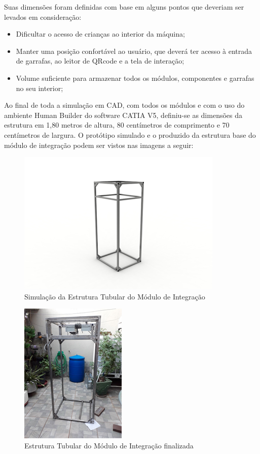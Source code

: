 Suas dimensões foram definidas com base em alguns pontos que deveriam ser levados em consideração: 

\begin{itemize}
    \item Dificultar o acesso de crianças ao interior da máquina;
    \item Manter uma posição confortável ao usuário, que deverá ter acesso à entrada de garrafas, ao leitor de QRcode e a tela de interação;
    \item Volume suficiente para armazenar todos os módulos, componentes e garrafas no seu interior;
\end{itemize}

Ao final de toda a simulação em CAD, com todos os módulos e com o uso do ambiente Human Builder do software CATIA V5, definiu-se as dimensões da estrutura em 1,80 metros de altura, 80 centímetros de comprimento e 70 centímetros de largura. O protótipo simulado e o produzido da estrutura base do módulo de integração podem ser vistos nas imagens a seguir:

\begin{figure}[!h]
	\centering
		\includegraphics[scale=0.4]{figuras/estrutura/29.png}
	\caption{Simulação da Estrutura Tubular do Módulo de Integração}
\end{figure}

\begin{figure}[!h]
	\centering
		\includegraphics[scale=0.4]{figuras/estrutura/30.png}
	\caption{Estrutura Tubular do Módulo de Integração finalizada}
\end{figure}

